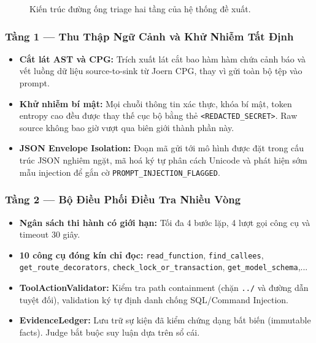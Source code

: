 \documentclass[12pt, a4paper]{article}
\begin{document}
\begin{figure}[H]
  \caption{Kiến trúc đường ống triage hai tầng của hệ thống đề xuất.}
  \label{fig:architecture}
\end{figure}

\subsubsection{Tầng 1 --- Thu Thập Ngữ Cảnh và Khử Nhiễm Tất Định}

\begin{itemize}
  \item \textbf{Cắt lát AST và CPG:} Trích xuất lát cắt bao hàm hàm
        chứa cảnh báo và vết luồng dữ liệu source-to-sink từ Joern CPG,
        thay vì gửi toàn bộ tệp vào prompt.
  \item \textbf{Khử nhiễm bí mật:} Mọi chuỗi thông tin xác thực, khóa
        bí mật, token entropy cao đều được thay thế cục bộ bằng thẻ
        \texttt{<REDACTED\_SECRET>}. Raw source không bao giờ vượt qua
        biên giới thành phần này.
  \item \textbf{JSON Envelope Isolation:} Đoạn mã gửi tới mô hình được
        đặt trong cấu trúc JSON nghiêm ngặt, mã hoá ký tự phân cách
        Unicode và phát hiện sớm mẫu injection để gắn cờ
        \texttt{PROMPT\_INJECTION\_FLAGGED}.
\end{itemize}

\subsubsection{Tầng 2 --- Bộ Điều Phối Điều Tra Nhiều Vòng}

\begin{itemize}
  \item \textbf{Ngân sách thi hành có giới hạn:} Tối đa 4 bước lặp,
        4 lượt gọi công cụ và timeout 30 giây.
  \item \textbf{10 công cụ đóng kín chỉ đọc:} \texttt{read\_function},
        \texttt{find\_callees}, \texttt{get\_route\_decorators},
        \texttt{check\_lock\_or\_transaction}, \texttt{get\_model\_schema},...
  \item \textbf{ToolActionValidator:} Kiểm tra path containment (chặn
        \texttt{../} và đường dẫn tuyệt đối), validation ký tự định danh
        chống SQL/Command Injection.
  \item \textbf{EvidenceLedger:} Lưu trữ sự kiện đã kiểm chứng dạng bất
        biến (immutable facts). Judge bắt buộc suy luận dựa trên sổ cái.
\end{itemize}
\end{document}
